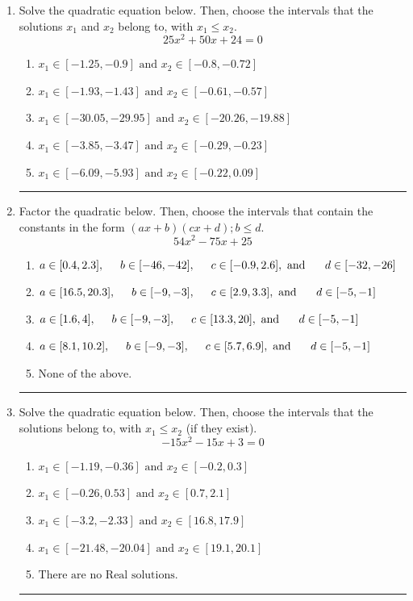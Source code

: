 \documentclass[14pt]{extbook}
\newcommand{\litem}[1]{\item#1\hspace*{-1cm}\rule{\textwidth}{0.4pt}}
\begin{document}
\begin{enumerate}
\litem{
Solve the quadratic equation below. Then, choose the intervals that the solutions $x_1$ and $x_2$ belong to, with $x_1 \leq x_2$.\[ 25x^{2} +50 x + 24 = 0 \]\begin{enumerate}[label=\Alph*.]
\item \( x_1 \in [-1.25, -0.9] \text{ and } x_2 \in [-0.8, -0.72] \)
\item \( x_1 \in [-1.93, -1.43] \text{ and } x_2 \in [-0.61, -0.57] \)
\item \( x_1 \in [-30.05, -29.95] \text{ and } x_2 \in [-20.26, -19.88] \)
\item \( x_1 \in [-3.85, -3.47] \text{ and } x_2 \in [-0.29, -0.23] \)
\item \( x_1 \in [-6.09, -5.93] \text{ and } x_2 \in [-0.22, 0.09] \)

\end{enumerate} }
\litem{
Factor the quadratic below. Then, choose the intervals that contain the constants in the form $(ax+b)(cx+d); b \leq d.$\[ 54x^{2} -75 x + 25 \]\begin{enumerate}[label=\Alph*.]
\item \( a \in [0.4, 2.3], \hspace*{5mm} b \in [-46, -42], \hspace*{5mm} c \in [-0.9, 2.6], \text{ and } \hspace*{5mm} d \in [-32, -26] \)
\item \( a \in [16.5, 20.3], \hspace*{5mm} b \in [-9, -3], \hspace*{5mm} c \in [2.9, 3.3], \text{ and } \hspace*{5mm} d \in [-5, -1] \)
\item \( a \in [1.6, 4], \hspace*{5mm} b \in [-9, -3], \hspace*{5mm} c \in [13.3, 20], \text{ and } \hspace*{5mm} d \in [-5, -1] \)
\item \( a \in [8.1, 10.2], \hspace*{5mm} b \in [-9, -3], \hspace*{5mm} c \in [5.7, 6.9], \text{ and } \hspace*{5mm} d \in [-5, -1] \)
\item \( \text{None of the above.} \)

\end{enumerate} }
\litem{
Solve the quadratic equation below. Then, choose the intervals that the solutions belong to, with $x_1 \leq x_2$ (if they exist).\[ -15x^{2} -15 x + 3 = 0 \]\begin{enumerate}[label=\Alph*.]
\item \( x_1 \in [-1.19, -0.36] \text{ and } x_2 \in [-0.2, 0.3] \)
\item \( x_1 \in [-0.26, 0.53] \text{ and } x_2 \in [0.7, 2.1] \)
\item \( x_1 \in [-3.2, -2.33] \text{ and } x_2 \in [16.8, 17.9] \)
\item \( x_1 \in [-21.48, -20.04] \text{ and } x_2 \in [19.1, 20.1] \)
\item \( \text{There are no Real solutions.} \)


\end{enumerate}}
\end{enumerate}
\end{document}
